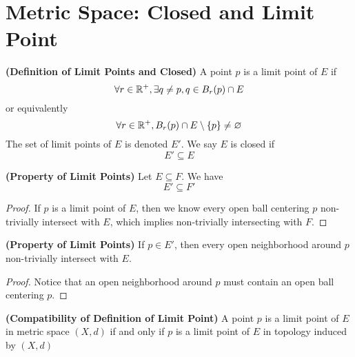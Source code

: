 \documentclass{report}
\begin{document}
\section{Metric Space: Closed and Limit Point}
\begin{definition}
\label{2.4.1}
\textbf{(Definition of Limit Points and Closed)} A point $p$ is a limit point of $E$ if 
 \begin{equation}
\forall r\in\mathbb{R}^+, \exists q\neq p, q\in B_r(p) \cap E
\end{equation}
or equivalently 
\begin{equation}
\forall r\in\mathbb{R}^+, B_r(p)\cap E\setminus \{ p \}\neq \varnothing
\end{equation}
The set of limit points of  $E$ is denoted $E'$. We say $E$ is closed if 
\begin{equation}
E'\subseteq E
\end{equation}
\end{definition}
\begin{theorem}
\label{2.4.2}
\textbf{(Property of Limit Points)} Let $E\subseteq F$. We have
\begin{equation}
E'\subseteq F'
\end{equation}
\end{theorem}
\begin{proof}
If $p$ is a limit point of $E$, then we know every open ball centering $p$ non-trivially intersect with  $E$, which implies non-trivially intersecting with $F$. 
\end{proof}
\begin{theorem}
\label{2.4.3}
\textbf{(Property of Limit Points)} If $p \in E'$, then every open neighborhood around $p$ non-trivially intersect with  $E$.
\end{theorem}
\begin{proof}
  Notice that an open neighborhood around $p$ must contain an open ball centering $p$.
\end{proof}
\begin{theorem}
\label{2.4.4}
\textbf{(Compatibility of Definition of Limit Point)} A point $p$ is a limit point of $E$ in metric space $(X,d)$ if and only if  $p$ is a limit point of $E$ in topology induced by $(X,d)$ 
\end{theorem}
\end{document}
